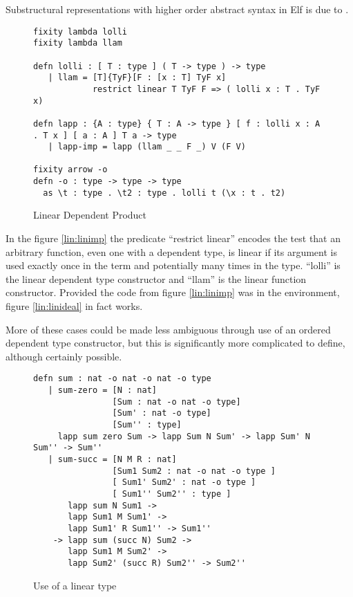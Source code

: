 Substructural representations with higher order abstract syntax in Elf is due to \citet{crary2010higher}.

\begin{figure}[H]
\begin{lstlisting}
fixity lambda lolli
fixity lambda llam

defn lolli : [ T : type ] ( T -> type ) -> type
   | llam = [T]{TyF}[F : [x : T] TyF x]
            restrict linear T TyF F => ( lolli x : T . TyF x)

defn lapp : {A : type} { T : A -> type } [ f : lolli x : A . T x ] [ a : A ] T a -> type
   | lapp-imp = lapp (llam _ _ F _) V (F V)

fixity arrow -o
defn -o : type -> type -> type
  as \t : type . \t2 : type . lolli t (\x : t . t2)
\end{lstlisting}
\caption{Linear Dependent Product}
\label{lin:lindep}
\end{figure}


In the figure \ref{lin:linimp} the predicate ``restrict linear'' encodes the test that an arbitrary function, even one with a dependent type, is linear \citep{benton1993term} if its argument is used
exactly once in the term and potentially many times in the type.  
``lolli'' is the linear dependent type constructor and ``llam'' is the linear function constructor.
Provided the code from figure \ref{lin:linimp} was in the environment, figure \ref{lin:linideal} in fact works.


More of these cases could be made less ambiguous through use of an ordered dependent type 
constructor, but this is significantly more complicated to define, although certainly possible.


\begin{figure}[H]
\begin{lstlisting}
defn sum : nat -o nat -o nat -o type
   | sum-zero = [N : nat]
                [Sum : nat -o nat -o type]
                [Sum' : nat -o type]
                [Sum'' : type]
     lapp sum zero Sum -> lapp Sum N Sum' -> lapp Sum' N Sum'' -> Sum''
   | sum-succ = [N M R : nat]
                [Sum1 Sum2 : nat -o nat -o type ]
                [ Sum1' Sum2' : nat -o type ]
                [ Sum1'' Sum2'' : type ]
       lapp sum N Sum1 ->
       lapp Sum1 M Sum1' -> 
       lapp Sum1' R Sum1'' -> Sum1''
    -> lapp sum (succ N) Sum2 -> 
       lapp Sum1 M Sum2' ->
       lapp Sum2' (succ R) Sum2'' -> Sum2''
\end{lstlisting}
\caption{Use of a linear type}
\label{lin:use}
\end{figure}


